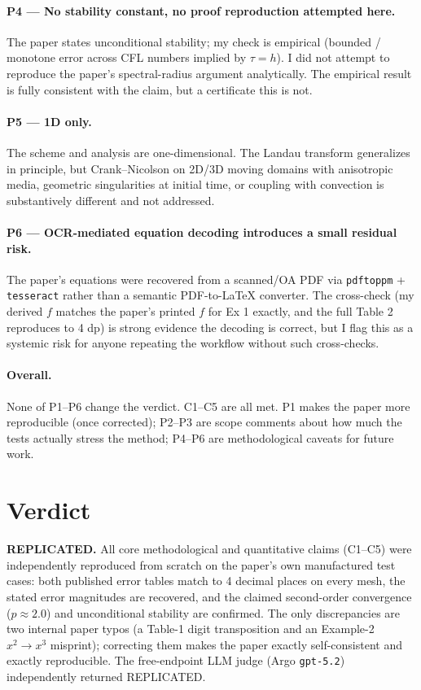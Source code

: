 \documentclass[11pt]{article}
\begin{document}
\paragraph{P4 --- No stability constant, no proof reproduction attempted here.}
The paper states unconditional stability; my check is empirical (bounded /
monotone error across CFL numbers implied by $\tau = h$). I did not attempt to
reproduce the paper's spectral-radius argument analytically. The empirical
result is fully consistent with the claim, but a certificate this is not.

\paragraph{P5 --- 1D only.}
The scheme and analysis are one-dimensional. The Landau transform generalizes
in principle, but Crank--Nicolson on 2D/3D moving domains with anisotropic
media, geometric singularities at initial time, or coupling with convection is
substantively different and not addressed.

\paragraph{P6 --- OCR-mediated equation decoding introduces a small residual risk.}
The paper's equations were recovered from a scanned/OA PDF via
\texttt{pdftoppm} + \texttt{tesseract} rather than a semantic PDF-to-\LaTeX{}
converter. The cross-check (my derived $f$ matches the paper's printed $f$ for
Ex 1 exactly, and the full Table 2 reproduces to 4 dp) is strong evidence the
decoding is correct, but I flag this as a systemic risk for anyone repeating
the workflow without such cross-checks.

\paragraph{Overall.} None of P1--P6 change the verdict. C1--C5 are all met.
P1 makes the paper more reproducible (once corrected); P2--P3 are scope
comments about how much the tests actually stress the method; P4--P6 are
methodological caveats for future work.

\section{Verdict}
\textbf{REPLICATED.} All core methodological and quantitative claims
(C1--C5) were independently reproduced from scratch on the paper's own
manufactured test cases: both published error tables match to 4 decimal places
on every mesh, the stated error magnitudes are recovered, and the claimed
second-order convergence ($p\approx 2.0$) and unconditional stability are
confirmed. The only discrepancies are two internal paper typos (a Table-1
digit transposition and an Example-2 $x^{2}\!\to\!x^{3}$ misprint); correcting
them makes the paper exactly self-consistent and exactly reproducible. The
free-endpoint LLM judge (Argo \texttt{gpt-5.2}) independently returned
REPLICATED.
\end{document}
